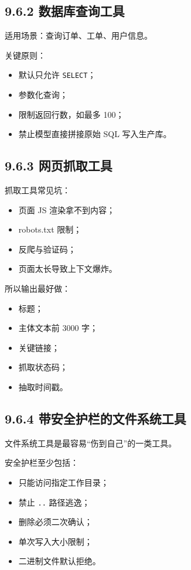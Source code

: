 \subsection{9.6.2 数据库查询工具}

适用场景：查询订单、工单、用户信息。


关键原则：


\begin{itemize}[leftmargin=2em]
\item 默认只允许 \texttt{SELECT}；
\item 参数化查询；
\item 限制返回行数，如最多 100；
\item 禁止模型直接拼接原始 SQL 写入生产库。
\end{itemize}

\subsection{9.6.3 网页抓取工具}

抓取工具常见坑：


\begin{itemize}[leftmargin=2em]
\item 页面 JS 渲染拿不到内容；
\item robots.txt 限制；
\item 反爬与验证码；
\item 页面太长导致上下文爆炸。
\end{itemize}

所以输出最好做：


\begin{itemize}[leftmargin=2em]
\item 标题；
\item 主体文本前 3000 字；
\item 关键链接；
\item 抓取状态码；
\item 抽取时间戳。
\end{itemize}

\subsection{9.6.4 带安全护栏的文件系统工具}

文件系统工具是最容易``伤到自己''的一类工具。


安全护栏至少包括：


\begin{itemize}[leftmargin=2em]
\item 只能访问指定工作目录；
\item 禁止 \texttt{..} 路径逃逸；
\item 删除必须二次确认；
\item 单次写入大小限制；
\item 二进制文件默认拒绝。
\end{itemize}

